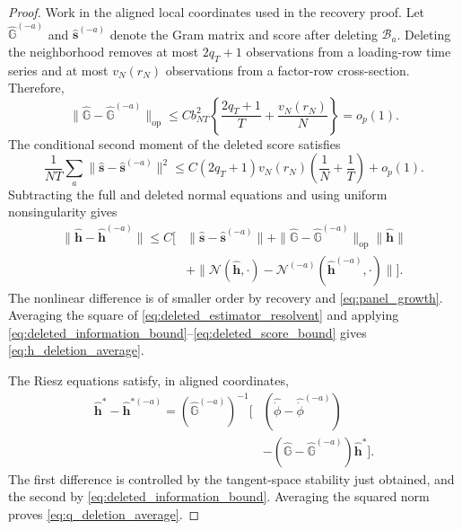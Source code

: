 \documentclass[11pt]{article}
\numberwithin{equation}{section}
\theoremstyle{remark}
\newcommand{\op}{\operatorname{op}}
\begin{document}
\begin{proof}
Work in the aligned local coordinates used in the recovery proof. Let $\widehat{\mathbb G}^{(-a)}$ and $\widehat{\bm s}^{(-a)}$ denote the Gram matrix and score after deleting $\mathcal B_a$. Deleting the neighborhood removes at most $2q_T+1$ observations from a loading-row time series and at most $v_N(r_N)$ observations from a factor-row cross-section. Therefore,
\begin{equation}
\label{eq:deleted_information_bound}
\|\widehat{\mathbb G}-\widehat{\mathbb G}^{(-a)}\|_{\op}
\le
C b_{NT}^2
\left\{
\frac{2q_T+1}{T}
+
\frac{v_N(r_N)}{N}
\right\}
=
o_p(1).
\end{equation}
The conditional second moment of the deleted score satisfies
\begin{equation}
\label{eq:deleted_score_bound}
\frac1{NT}
\sum_a
\|
\widehat{\bm s}-\widehat{\bm s}^{(-a)}
\|^2
\le
C(2q_T+1)v_N(r_N)
\left(
\frac1N+\frac1T
\right)
+
o_p(1).
\end{equation}
Subtracting the full and deleted normal equations and using uniform nonsingularity gives
\begin{align}
\|\widehat{\bm h}-\widehat{\bm h}^{(-a)}\|
\le C\Big[
&
\|\widehat{\bm s}-\widehat{\bm s}^{(-a)}\|
+
\|\widehat{\mathbb G}-\widehat{\mathbb G}^{(-a)}\|_{\op}
\|\widehat{\bm h}\|
\nonumber\\
&+
\|\mathcal N(\widehat{\bm h},\cdot)
-\mathcal N^{(-a)}(\widehat{\bm h}^{(-a)},\cdot)\|
\Big].
\label{eq:deleted_estimator_resolvent}
\end{align}
The nonlinear difference is of smaller order by recovery and \eqref{eq:panel_growth}. Averaging the square of \eqref{eq:deleted_estimator_resolvent} and applying \eqref{eq:deleted_information_bound}--\eqref{eq:deleted_score_bound} gives \eqref{eq:h_deletion_average}.

The Riesz equations satisfy, in aligned coordinates,
\begin{align*}
\widehat{\bm h}^*
-
\widehat{\bm h}^{*(-a)}
=
(\widehat{\mathbb G}^{(-a)})^{-1}
\Big[
&
(\widehat{\dot\phi}-\widehat{\dot\phi}^{(-a)})
\\
&-
(\widehat{\mathbb G}-\widehat{\mathbb G}^{(-a)})
\widehat{\bm h}^*
\Big].
\end{align*}
The first difference is controlled by the tangent-space stability just obtained, and the second by \eqref{eq:deleted_information_bound}. Averaging the squared norm proves \eqref{eq:q_deletion_average}.


\end{proof}
\end{document}
